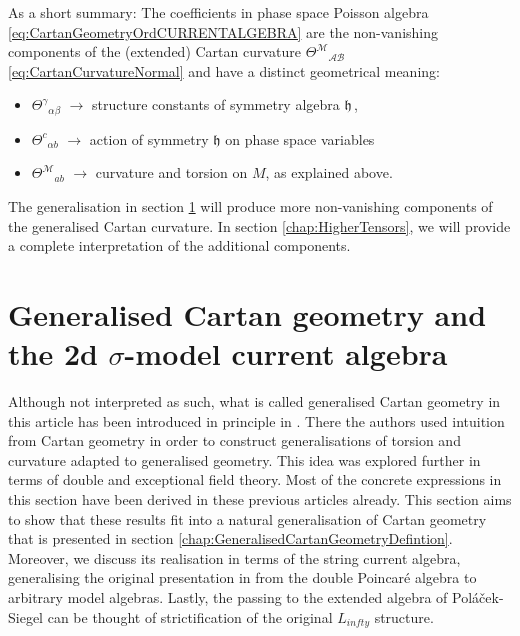 \documentclass[11pt,a4paper]{article}
\numberwithin{equation}{section}
\begin{document}
As a short summary: The coefficients in phase space Poisson algebra \eqref{eq:CartanGeometryOrdCURRENTALGEBRA} are the non-vanishing components of the (extended) Cartan curvature ${\Theta^{\mathcal{M}}}_{\mathcal{AB}}$ \eqref{eq:CartanCurvatureNormal} and have a distinct geometrical meaning: 
\begin{itemize}
  \item $\Theta^\gamma{}_{\alpha \beta  }$ $\rightarrow$ structure constants of symmetry algebra $\mathfrak{h}$\,,
  \item $\Theta^c{}_{\alpha b  }$ $\rightarrow$ action of symmetry $\mathfrak{h}$ on phase space variables\,
  \item ${\Theta^{\mathcal{M}}}_{ab}$ $\rightarrow$ curvature and torsion on $M$, as explained above.
\end{itemize}
The generalisation in section \ref{chap:GeneralisedCartanGeometry} will produce more non-vanishing components of the generalised Cartan curvature. In section \ref{chap:HigherTensors}, we will provide a complete interpretation of the additional components.



\section{Generalised Cartan geometry and the 2d $\sigma$-model current algebra} \label{chap:GeneralisedCartanGeometry}

Although not interpreted as such, what is called generalised Cartan geometry in this article has been introduced in principle in \cite{Polacek:2013nla}. There the authors used intuition from Cartan geometry in order to construct generalisations of torsion and curvature adapted to generalised geometry. This idea was explored further \cite{Butter:2022iza,Hassler:2023axp} in terms of double \cite{Siegel:1993th,Siegel:1993xq,Hull:2009mi,Hohm:2010pp} and exceptional field theory. Most of the concrete expressions in this section have been derived in these previous articles already. This section aims to show that these results fit into a natural generalisation of Cartan geometry that is presented in section \ref{chap:GeneralisedCartanGeometryDefintion}. Moreover, we discuss its realisation in terms of the string current algebra, generalising the original presentation in \cite{Polacek:2013nla} from the double Poincar\'e algebra to arbitrary model algebras.
Lastly, the passing to the extended algebra of Poláček-Siegel can be thought of strictification of the original $L_{infty}$ structure.
\end{document}
